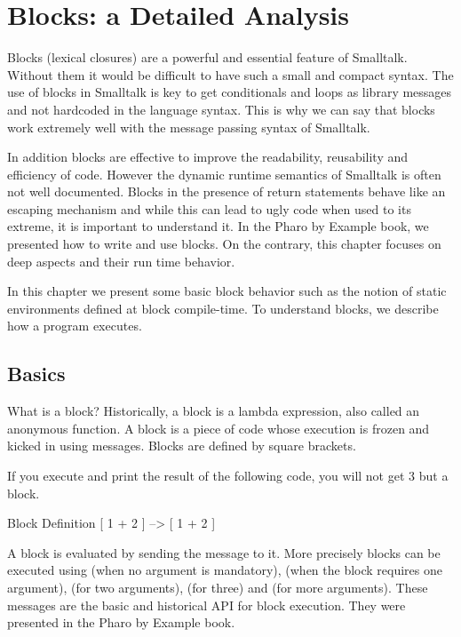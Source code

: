 \documentclass[a4paper,10pt,twoside]{book}
\begin{document}
\fi
\sloppy
\chapter{Blocks: a Detailed Analysis}


Blocks (lexical closures) are a powerful and essential feature of Smalltalk. Without them it
would be difficult to have such a small and compact syntax. The use of blocks in Smalltalk
is key to get conditionals and loops as library messages and not hardcoded in the language syntax. This is why we can say that
blocks work extremely well with the message passing syntax of Smalltalk.

In addition blocks are  effective to improve the readability, reusability and efficiency of code.
However the dynamic runtime semantics of Smalltalk is often not well documented. Blocks in the presence of return statements behave like an escaping mechanism and while this can lead to ugly code when used to its extreme, it is important to understand it. In the Pharo by Example book, we presented how to write and use blocks. On the contrary, this chapter focuses on deep aspects and their run time behavior.

In this chapter we present some basic block behavior such as the notion of static environments defined at block compile-time. To understand blocks, we describe how  a program executes.

\section{Basics}

What is a block? Historically, a block is a lambda expression, also called an anonymous function. A block is a piece of code whose execution is frozen and kicked in using messages. Blocks are defined by square brackets.

If you execute and print the result of the following code, you will not get 3 but a block.

\begin{code}{Block Definition}
[ 1 + 2 ] --> [ 1 + 2 ]
\end{code}

 A block is evaluated by sending the  message to it. More precisely blocks can be executed using  (when no argument is mandatory),  (when the block requires one argument),  (for two arguments),  (for three) and  (for more arguments). These messages are the basic and historical API for block execution. They were presented in the Pharo by Example book.
\end{document}
